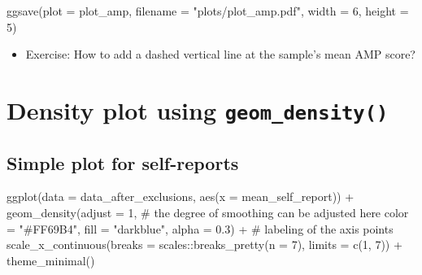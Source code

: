 \documentclass[
  letterpaper,
  DIV=11,
  numbers=noendperiod]{scrreprt}
\newenvironment{Shaded}{\begin{snugshade}}{\end{snugshade}}
\newcommand{\AttributeTok}[1]{\textcolor[rgb]{0.40,0.45,0.13}{#1}}
\newcommand{\CommentTok}[1]{\textcolor[rgb]{0.37,0.37,0.37}{#1}}
\newcommand{\DecValTok}[1]{\textcolor[rgb]{0.68,0.00,0.00}{#1}}
\newcommand{\FloatTok}[1]{\textcolor[rgb]{0.68,0.00,0.00}{#1}}
\newcommand{\FunctionTok}[1]{\textcolor[rgb]{0.28,0.35,0.67}{#1}}
\newcommand{\NormalTok}[1]{\textcolor[rgb]{0.00,0.23,0.31}{#1}}
\newcommand{\SpecialCharTok}[1]{\textcolor[rgb]{0.37,0.37,0.37}{#1}}
\newcommand{\StringTok}[1]{\textcolor[rgb]{0.13,0.47,0.30}{#1}}
\providecommand{\tightlist}{%
  \setlength{\itemsep}{0pt}\setlength{\parskip}{0pt}}\usepackage{longtable,booktabs,array}
\begin{document}
\begin{Shaded}
\begin{Highlighting}[]
\FunctionTok{ggsave}\NormalTok{(}\AttributeTok{plot =}\NormalTok{ plot\_amp,}
       \AttributeTok{filename =} \StringTok{"plots/plot\_amp.pdf"}\NormalTok{, }
       \AttributeTok{width =} \DecValTok{6}\NormalTok{,}
       \AttributeTok{height =} \DecValTok{5}\NormalTok{)}
\end{Highlighting}
\end{Shaded}

\begin{itemize}
\tightlist
\item
  Exercise: How to add a dashed vertical line at the sample's mean AMP
  score?
\end{itemize}


\chapter{\texorpdfstring{Density plot using
\texttt{geom\_density()}}{Density plot using geom\_density()}}\label{density-plot-using-geom_density}

\section{Simple plot for
self-reports}\label{simple-plot-for-self-reports-1}

\begin{Shaded}
\begin{Highlighting}[]
\FunctionTok{ggplot}\NormalTok{(}\AttributeTok{data =}\NormalTok{ data\_after\_exclusions,}
       \FunctionTok{aes}\NormalTok{(}\AttributeTok{x =}\NormalTok{ mean\_self\_report)) }\SpecialCharTok{+}
  \FunctionTok{geom\_density}\NormalTok{(}\AttributeTok{adjust =} \DecValTok{1}\NormalTok{, }\CommentTok{\# the degree of smoothing can be adjusted here }
               \AttributeTok{color =} \StringTok{"\#FF69B4"}\NormalTok{,}
               \AttributeTok{fill =} \StringTok{"darkblue"}\NormalTok{, }
               \AttributeTok{alpha =} \FloatTok{0.3}\NormalTok{) }\SpecialCharTok{+}
  \CommentTok{\# labeling of the axis points}
  \FunctionTok{scale\_x\_continuous}\NormalTok{(}\AttributeTok{breaks =}\NormalTok{ scales}\SpecialCharTok{::}\FunctionTok{breaks\_pretty}\NormalTok{(}\AttributeTok{n =} \DecValTok{7}\NormalTok{),}
                     \AttributeTok{limits =} \FunctionTok{c}\NormalTok{(}\DecValTok{1}\NormalTok{, }\DecValTok{7}\NormalTok{)) }\SpecialCharTok{+}
  \FunctionTok{theme\_minimal}\NormalTok{()}
\end{Highlighting}
\end{Shaded}
\end{document}
